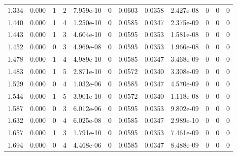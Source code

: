 \documentclass[preview]{standalone}
\begin{document}
{{\begin{tabular}{L{1.2cm}C{1.2cm} C{0.3cm}C{0.5cm} C{1.4cm}C{1.4cm} C{1.4cm}C{1.4cm} C{1.6cm}C{1.6cm} C{1.6cm}C{1.6cm}}
  1.334  &  0.000  & 1     &  2 &  7.959e-10  & 0  &  0.0603&   0.0358& 2.427e-08 & 0   &  0 & 0  \\ 
  1.440  &  0.000  & 1     &  4 &  1.250e-10  & 0  &  0.0585&   0.0347& 2.375e-09 & 0   &  0 & 0  \\ 
  1.443  &  0.000  & 1     &  3 &  4.604e-10  & 0  &  0.0595&   0.0353& 1.581e-08 & 0   &  0 & 0  \\ 
  1.452  &  0.000  & 0     &  3 &  4.969e-08  & 0  &  0.0595&   0.0353& 1.966e-08 & 0   &  0 & 0  \\ 
  1.478  &  0.000  & 1     &  4 &  4.989e-10  & 0  &  0.0585&   0.0347& 3.468e-09 & 0   &  0 & 0  \\ 
  1.483  &  0.000  & 1     &  5 &  2.871e-10  & 0  &  0.0572&   0.0340& 3.308e-09 & 0   &  0 & 0  \\ 
  1.529  &  0.000  & 0     &  4 &  1.032e-06  & 0  &  0.0585&   0.0347& 4.570e-09 & 0   &  0 & 0  \\ 
  1.544  &  0.000  & 1     &  5 &  3.901e-10  & 0  &  0.0572&   0.0340& 1.118e-08 & 0   &  0 & 0  \\ 
  1.587  &  0.000  & 0     &  3 &  6.012e-06  & 0  &  0.0595&   0.0353& 9.802e-09 & 0   &  0 & 0  \\ 
  1.632  &  0.000  & 0     &  4 &  6.025e-08  & 0  &  0.0585&   0.0347& 2.989e-10 & 0   &  0 & 0  \\ 
  1.657  &  0.000  & 1     &  3 &  1.791e-10  & 0  &  0.0595&   0.0353& 7.461e-09 & 0   &  0 & 0  \\ 
  1.694  &  0.000  & 0     &  4 &  4.468e-06  & 0  &  0.0585&   0.0347& 8.488e-09 & 0   &  0 & 0  \\ 
\hline 
\end{tabular} 

}}
\end{document}
